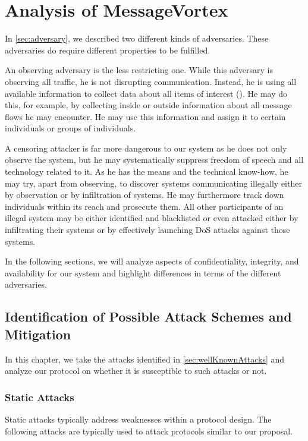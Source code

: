 \part{Analysis of MessageVortex\label{sec:analysis}}
In \cref{sec:adversary}, we described two different kinds of adversaries. These adversaries do require different properties to be fulfilled. 

An observing adversary is the less restricting one. While this adversary is observing all traffic, he is not disrupting communication. Instead, he is using all available information to collect data about all items of interest (). He may do this, for example, by collecting inside or outside information about all message flows he may encounter. He may use this information and assign it to certain individuals or groups of individuals.

A censoring attacker is far more dangerous to our system as he does not only observe the system, but he may systematically suppress freedom of speech and all technology related to it. As he has the means and the technical know-how, he may try, apart from observing, to discover systems communicating illegally either by observation or by infiltration of systems. He may furthermore track down individuals within its reach and prosecute them. All other participants of an illegal system may be either identified and blacklisted or even attacked either by infiltrating their systems or by effectively launching DoS attacks against those systems.

In the following sections, we will analyze aspects of confidentiality, integrity, and availability for our system and highlight differences in terms of the different adversaries.

\chapter{Identification of Possible Attack Schemes and Mitigation}\label{sec:attacks}
In this chapter, we take the attacks identified in \cref{sec:wellKnownAttacks} and analyze our protocol on whether it is susceptible to such attacks or not.

\section{Static Attacks}
Static attacks typically address weaknesses within a protocol design. The following attacks are typically used to attack protocols similar to our proposal.

